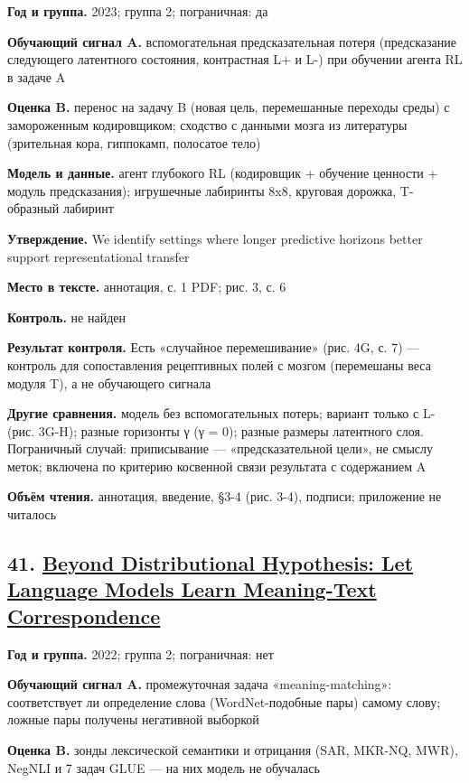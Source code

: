 \textbf{Год и группа.} 2023; группа 2; пограничная: да

\textbf{Обучающий сигнал A.} вспомогательная предсказательная потеря (предсказание следующего латентного состояния, контрастная L+ и L-) при обучении агента RL в задаче A

\textbf{Оценка B.} перенос на задачу B (новая цель, перемешанные переходы среды) с замороженным кодировщиком; сходство с данными мозга из литературы (зрительная кора, гиппокамп, полосатое тело)

\textbf{Модель и данные.} агент глубокого RL (кодировщик + обучение ценности + модуль предсказания); игрушечные лабиринты 8x8, круговая дорожка, T-образный лабиринт

\textbf{Утверждение.} We identify settings where longer predictive horizons better support representational transfer

\textbf{Место в тексте.} аннотация, с. 1 PDF; рис. 3, с. 6

\textbf{Контроль.} не найден

\textbf{Результат контроля.} Есть «случайное перемешивание» (рис. 4G, с. 7) — контроль для сопоставления рецептивных полей с мозгом (перемешаны веса модуля T), а не обучающего сигнала

\textbf{Другие сравнения.} модель без вспомогательных потерь; вариант только с L- (рис. 3G-H); разные горизонты γ (γ = 0); разные размеры латентного слоя. Пограничный случай: приписывание — «предсказательной цели», не смыслу меток; включена по критерию косвенной связи результата с содержанием A

\textbf{Объём чтения.} аннотация, введение, §3-4 (рис. 3-4), подписи; приложение не читалось


\subsection*{41. \href{https://doi.org/10.18653/v1/2022.findings-naacl.156}{Beyond Distributional Hypothesis: Let Language Models Learn Meaning-Text Correspondence}}

\textbf{Год и группа.} 2022; группа 2; пограничная: нет

\textbf{Обучающий сигнал A.} промежуточная задача «meaning-matching»: соответствует ли определение слова (WordNet-подобные пары) самому слову; ложные пары получены негативной выборкой

\textbf{Оценка B.} зонды лексической семантики и отрицания (SAR, MKR-NQ, MWR), NegNLI и 7 задач GLUE — на них модель не обучалась

